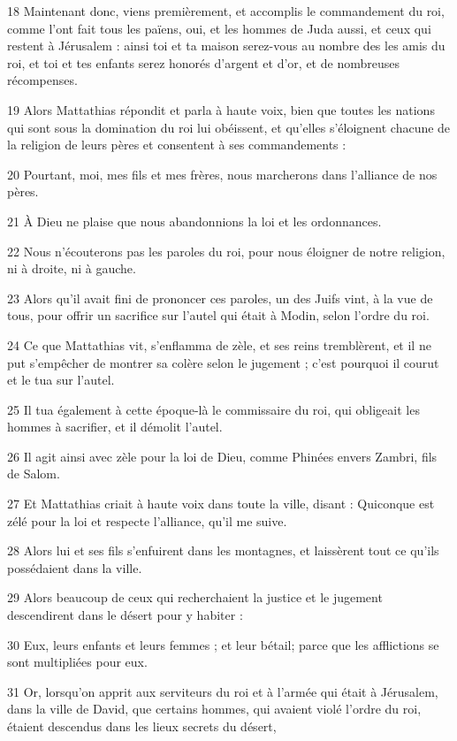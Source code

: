 \par 18 Maintenant donc, viens premièrement, et accomplis le commandement du roi, comme l'ont fait tous les païens, oui, et les hommes de Juda aussi, et ceux qui restent à Jérusalem : ainsi toi et ta maison serez-vous au nombre des les amis du roi, et toi et tes enfants serez honorés d'argent et d'or, et de nombreuses récompenses.
\par 19 Alors Mattathias répondit et parla à haute voix, bien que toutes les nations qui sont sous la domination du roi lui obéissent, et qu'elles s'éloignent chacune de la religion de leurs pères et consentent à ses commandements :
\par 20 Pourtant, moi, mes fils et mes frères, nous marcherons dans l'alliance de nos pères.
\par 21 À Dieu ne plaise que nous abandonnions la loi et les ordonnances.
\par 22 Nous n'écouterons pas les paroles du roi, pour nous éloigner de notre religion, ni à droite, ni à gauche.
\par 23 Alors qu'il avait fini de prononcer ces paroles, un des Juifs vint, à la vue de tous, pour offrir un sacrifice sur l'autel qui était à Modin, selon l'ordre du roi.
\par 24 Ce que Mattathias vit, s'enflamma de zèle, et ses reins tremblèrent, et il ne put s'empêcher de montrer sa colère selon le jugement ; c'est pourquoi il courut et le tua sur l'autel.
\par 25 Il tua également à cette époque-là le commissaire du roi, qui obligeait les hommes à sacrifier, et il démolit l'autel.
\par 26 Il agit ainsi avec zèle pour la loi de Dieu, comme Phinées envers Zambri, fils de Salom.
\par 27 Et Mattathias criait à haute voix dans toute la ville, disant : Quiconque est zélé pour la loi et respecte l'alliance, qu'il me suive.
\par 28 Alors lui et ses fils s'enfuirent dans les montagnes, et laissèrent tout ce qu'ils possédaient dans la ville.
\par 29 Alors beaucoup de ceux qui recherchaient la justice et le jugement descendirent dans le désert pour y habiter :
\par 30 Eux, leurs enfants et leurs femmes ; et leur bétail; parce que les afflictions se sont multipliées pour eux.
\par 31 Or, lorsqu'on apprit aux serviteurs du roi et à l'armée qui était à Jérusalem, dans la ville de David, que certains hommes, qui avaient violé l'ordre du roi, étaient descendus dans les lieux secrets du désert,
